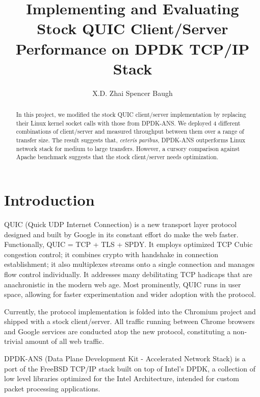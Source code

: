 \documentclass{sig-alternate-05-2015}
\begin{document}
\title{Implementing and Evaluating Stock QUIC Client/Server Performance on DPDK TCP/IP Stack}

\author{
\alignauthor X.D. Zhai
\alignauthor Spencer Baugh 
}

\maketitle
\begin{abstract}
In this project, we modified the stock QUIC client/server implementation by replacing their Linux kernel socket calls with those from DPDK-ANS. We deployed 4 different combinations of client/server and measured throughput between them over a range of transfer size. The result suggests that, \textit{ceteris paribus}, DPDK-ANS outperforms Linux network stack for medium to large transfers. However, a cursory comparison against Apache benchmark suggests that the stock client/server needs optimization.
\end{abstract}

\section{Introduction}
QUIC (Quick UDP Internet Connection) is a new transport layer protocol designed and built by Google in its constant effort do make the web faster. Functionally, QUIC = TCP + TLS + SPDY. It employs optimized TCP Cubic congestion control; it combines crypto with handshake in connection establishment; it also multiplexes streams onto a single connection and manages flow control individually. It addresses many debilitating TCP hadicaps that are anachronistic in the modern web age. Most prominently, QUIC runs in user space, allowing for faster experimentation and wider adoption with the protocol. 

Currently, the protocol implementation is folded into the Chromium project and shipped with a stock client/server. All traffic running between Chrome browsers and Google services are conducted atop the new protocol, constituting a non-trivial amount of all web traffic.

DPDK-ANS (Data Plane Development Kit - Accelerated Network Stack) is a port of the FreeBSD TCP/IP stack built on top of Intel's DPDK, a collection of low level libraries optimized for the Intel Architecture, intended for custom packet processing applications. 
\end{document}
